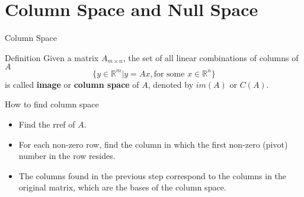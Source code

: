 \documentclass[aspectratio=169, UTF8]{ctexbeamer}
\begin{document}
\section{Column Space and Null Space}    
\begin{frame}[label=4]{Column Space} 
    \begin{block}{Definition}
        Given a matrix $A_{m\times n}$, the set of all linear combinations of columns of $A$
        \begin{equation*}
            \{y\in\mathbb{R}^m|y=Ax, \text{for some } x\in\mathbb{R}^n\}
        \end{equation*}
        is called \textbf{image} or \textbf{column space} of $A$, denoted by $im(A)$ or $C(A)$.
    \end{block}
    \begin{block}{How to find column space}
        \begin{itemize}
            \item Find the rref of $A$.
            \item For each non-zero row, find the column in which the first non-zero (pivot) number in the row resides.
            \item The columns found in the previous step correspond to the columns in the original matrix, which are the bases of the column space.
        \end{itemize}
    \end{block}
\end{frame}
\end{document}
